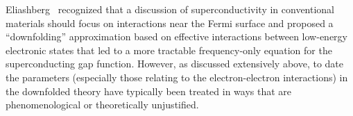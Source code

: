 \documentclass[%
 reprint,
superscriptaddress,
 amsmath,amssymb,
 aps,
prx,
]{revtex4-2}
\begin{document}
Eliashberg~\cite{eliashberg1960interactions, eliashberg1961temperature} recognized that a discussion of superconductivity in conventional materials should focus on interactions near the Fermi surface and proposed a ``downfolding'' approximation based on effective interactions between low-energy electronic states that led to a more tractable frequency-only equation for the superconducting gap function. However, as discussed extensively above, to date the parameters (especially those relating to the electron-electron interactions) in the downfolded theory have typically been treated in  ways that are phenomenological or theoretically unjustified. 
\end{document}
